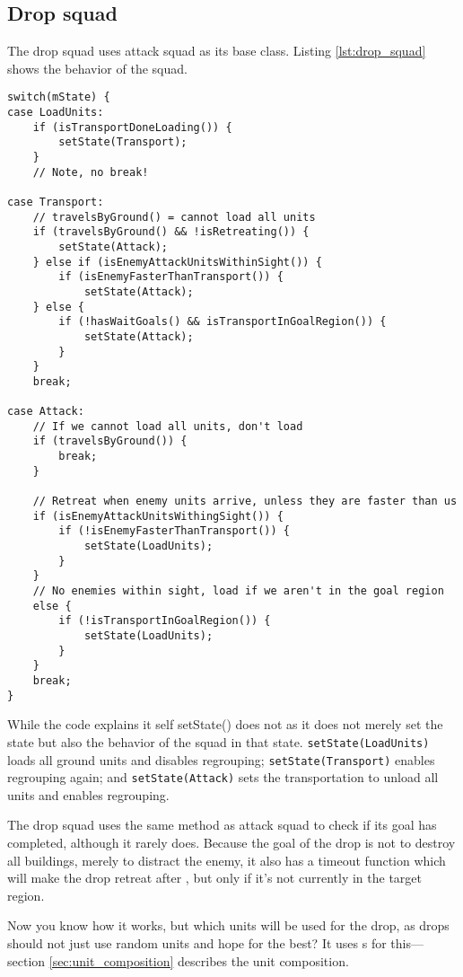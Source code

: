\subsection{Drop squad}
\label{sec:drop_squad}
The drop squad uses attack squad as its base class. Listing \ref{lst:drop_squad} shows the behavior of the squad.
\begin{lstlisting}[caption={Drop squad behavior.},label={lst:drop_squad}]
switch(mState) {
case LoadUnits:
	if (isTransportDoneLoading()) {
		setState(Transport);
	}
	// Note, no break!

case Transport:
	// travelsByGround() = cannot load all units
	if (travelsByGround() && !isRetreating()) {
		setState(Attack);
	} else if (isEnemyAttackUnitsWithinSight()) {
		if (isEnemyFasterThanTransport()) {
			setState(Attack);
	} else {
		if (!hasWaitGoals() && isTransportInGoalRegion()) {
			setState(Attack);
		}
	}
	break;

case Attack:
	// If we cannot load all units, don't load
	if (travelsByGround()) {
		break;
	}

	// Retreat when enemy units arrive, unless they are faster than us
	if (isEnemyAttackUnitsWithingSight()) {
		if (!isEnemyFasterThanTransport()) {
			setState(LoadUnits);
		}
	}
	// No enemies within sight, load if we aren't in the goal region
	else {
		if (!isTransportInGoalRegion()) {
			setState(LoadUnits);
		}
	}
	break;
}
\end{lstlisting}
While the code explains it self setState() does not as it does not merely set the state but also the behavior of the squad in that state. \texttt{setState(LoadUnits)} loads all ground units and disables regrouping; \texttt{setState(Transport)} enables regrouping again; and \texttt{setState(Attack)} sets the transportation to unload all units and enables regrouping.

The drop squad uses the same method as attack squad to check if its goal has completed, although it rarely does. Because the goal of the drop is not to destroy all buildings, merely to distract the enemy, it also has a timeout function which will make the drop retreat after \squadDropAttackTimeout, but only if it's not currently in the target region.

Now you know how it works, but which units will be used for the drop, as drops should not just use random units and hope for the best? It uses s for this—section \ref{sec:unit_composition} describes the unit composition. 


